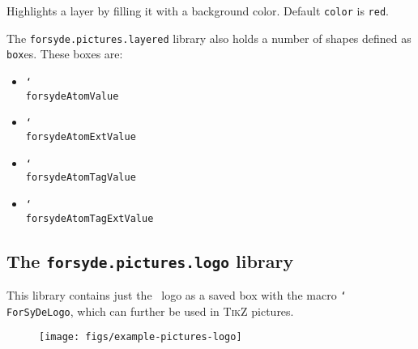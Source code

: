 \vspace{1ex}
\hspace{1pt}

\noindent Highlights a layer by filling it with a background color. Default \texttt{color} is \texttt{red}.

The  \texttt{forsyde.pictures.layered} library also holds a number of shapes defined as \texttt{box}es. These boxes are:

\begin{itemize}
\item \texttt{\char`\\forsydeAtomValue}
\item \texttt{\char`\\forsydeAtomExtValue}
\item \texttt{\char`\\forsydeAtomTagValue}
\item \texttt{\char`\\forsydeAtomTagExtValue}
\end{itemize}

\subsection{The \texttt{forsyde.pictures.logo} library}
\label{sec:forsyde-pictures-logo}

This library contains just the \ForSyDe\ logo as a saved box with the macro \texttt{\char`\\ForSyDeLogo}, which can further be used in \textsc{TikZ} pictures.

\begin{figure}[h]\hspace{-2ex}
  \centering
  \begin{minipage}{.5\linewidth}
  
\end{minipage}
\hfill
\begin{minipage}{.35\linewidth}
  \texttt{[image: figs/example-pictures-logo]}  
\end{minipage}
\end{figure}


